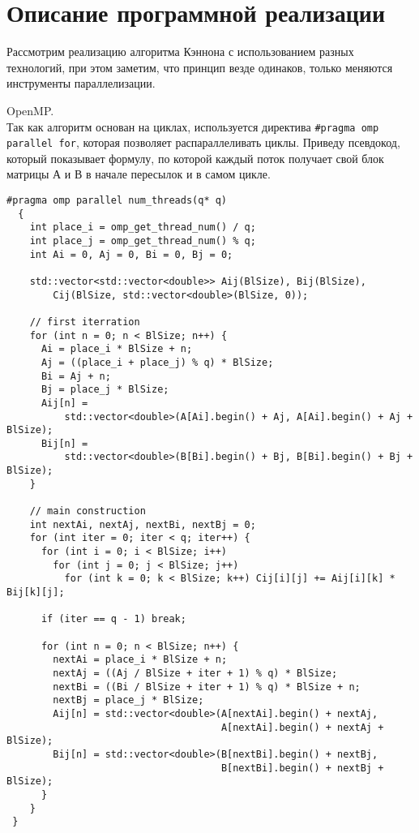 \documentclass{report}
\begin{document}
\section*{Описание программной реализации}
Рассмотрим реализацию алгоритма Кэннона с использованием разных технологий, при этом заметим, что принцип везде одинаков, только меняются инструменты параллелизации.
\par OpenMP.\\
Так как алгоритм основан на циклах, используется директива \verb|#pragma omp parallel for|, которая позволяет распараллеливать циклы.
Приведу псевдокод, который показывает формулу, по которой каждый поток получает свой блок матрицы А и В в начале пересылок и в самом цикле.
\begin{lstlisting}
#pragma omp parallel num_threads(q* q)
  {
    int place_i = omp_get_thread_num() / q;
    int place_j = omp_get_thread_num() % q;
    int Ai = 0, Aj = 0, Bi = 0, Bj = 0;

    std::vector<std::vector<double>> Aij(BlSize), Bij(BlSize),
        Cij(BlSize, std::vector<double>(BlSize, 0));

    // first iterration
    for (int n = 0; n < BlSize; n++) {
      Ai = place_i * BlSize + n;
      Aj = ((place_i + place_j) % q) * BlSize;
      Bi = Aj + n;
      Bj = place_j * BlSize;
      Aij[n] =
          std::vector<double>(A[Ai].begin() + Aj, A[Ai].begin() + Aj + BlSize);
      Bij[n] =
          std::vector<double>(B[Bi].begin() + Bj, B[Bi].begin() + Bj + BlSize);
    }

    // main construction
    int nextAi, nextAj, nextBi, nextBj = 0;
    for (int iter = 0; iter < q; iter++) {
      for (int i = 0; i < BlSize; i++)
        for (int j = 0; j < BlSize; j++)
          for (int k = 0; k < BlSize; k++) Cij[i][j] += Aij[i][k] * Bij[k][j];

      if (iter == q - 1) break;

      for (int n = 0; n < BlSize; n++) {
        nextAi = place_i * BlSize + n;
        nextAj = ((Aj / BlSize + iter + 1) % q) * BlSize;
        nextBi = ((Bi / BlSize + iter + 1) % q) * BlSize + n;
        nextBj = place_j * BlSize;
        Aij[n] = std::vector<double>(A[nextAi].begin() + nextAj,
                                     A[nextAi].begin() + nextAj + BlSize);
        Bij[n] = std::vector<double>(B[nextBi].begin() + nextBj,
                                     B[nextBi].begin() + nextBj + BlSize);
      }
    }
 }

\end{lstlisting}
\end{document}
